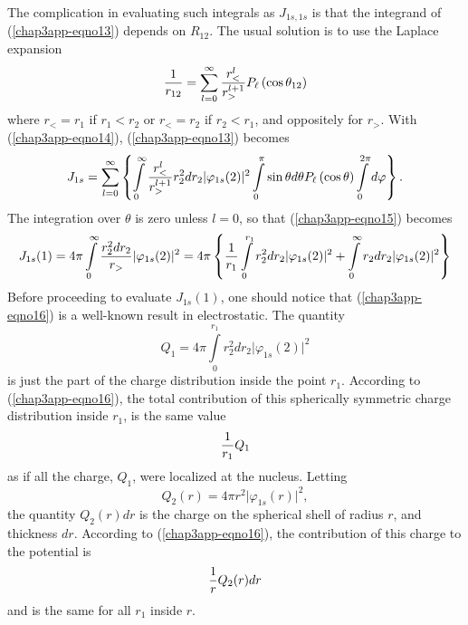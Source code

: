 The complication in evaluating such integrals as $J_{1s , 1s}$ is that
the integrand of (\ref{chap3app-eqno13}) depends on $R_{12}$.  The usual
solution is to use the Laplace expansion
\begin{equation}
{1 \over r_{12}} = \sum^{\infty}_{l=0} {r^l_< \over r^{l+1}_>} P_\ell 
\left( \cos \theta_{12} \right)
\label{chap3app-eqno14}
\end{equation}
where $r_< = r_1$ if $r_1 < r_2$ or $r_< = r_2$ if $r_2 < r_1$, and
oppositely for $r_>$.  With (\ref{chap3app-eqno14}),
(\ref{chap3app-eqno13}) becomes
\begin{equation}
J_{1s} = \sum^{\infty}_{l=0} \left\{ \int\limits^{\infty}_{0} {r^l_< 
\over r^{l+1}_>} r^2_2 dr_2 \vert \varphi_{1s} (2) \vert^2 
\int\limits^{\pi}_{0} \sin \theta d \theta P_\ell \left( \cos \theta 
\right) \int\limits^{2 \pi}_{0} d \varphi \right\}.
\label{chap3app-eqno15}
\end{equation}
The integration over $\theta$ is zero unless $l = 0$, so that
(\ref{chap3app-eqno15}) becomes
\begin{equation}
J_{1s} (1) = 4\pi \int\limits^{\infty}_{0} {r^2_2 dr_2 \over r_>} 
\vert \varphi_{1s} (2) \vert^2 = 4 \pi \left\{ {1 \over r_1} 
\int\limits^{r_1}_{0} r^2_2 dr_2 \vert \varphi_{1s} (2) \vert^2 + 
\int\limits^{\infty}_{0} r_2 dr_2 \vert \varphi_{1s} (2) \vert^2 
\right\}
\label{chap3app-eqno16}
\end{equation}
Before proceeding to evaluate $J_{1s}(1)$, one should notice that
(\ref{chap3app-eqno16}) is a well-known result in electrostatic. The
quantity
\begin{equation}
Q_1 = 4 \pi \int\limits^{r_1}_{0} r^2_2 dr_2 \vert \varphi_{1s} (2) \vert^2
\end{equation}
is just the part of the charge distribution inside the point $r_1$.
According to (\ref{chap3app-eqno16}), the total contribution of this
spherically symmetric charge distribution inside $r_1$, is the same
value
\begin{equation}
{1 \over r_1} Q_1
\end{equation}
as if all the charge, $Q_1$, were localized at the nucleus.  Letting
\begin{equation}
Q_2 (r) = 4 \pi r^2 \vert \varphi_{1s} (r) \vert^2 ,
\end{equation}
the quantity $Q_2(r)dr$ is the charge on the spherical shell of radius
$r$, and thickness $dr$.  According to (\ref{chap3app-eqno16}), the
contribution of this charge to the potential is
\begin{equation}
{1 \over r} Q_2 (r) dr
\end{equation}
and is the same for all $r_1$ inside $r$.

